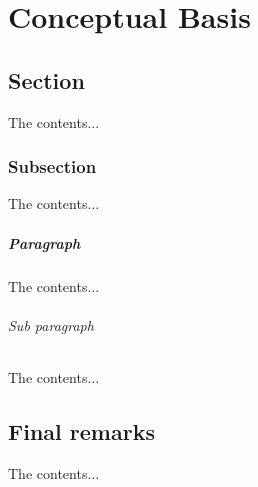 %
%

\chapter{Conceptual Basis} %
\label{chap:conceptual_basis}

\section{Section}
The contents...

\subsection{Subsection}
The contents...

\paragraph{Paragraph}
The contents...

\subparagraph{Sub paragraph}
The contents...


%
%

\section{Final remarks}
The contents...